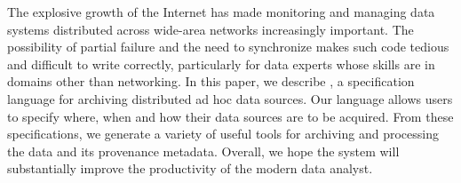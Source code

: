 The explosive growth of the Internet has made monitoring and managing
data systems distributed across wide-area networks increasingly
important.  The possibility of partial failure and the need to
synchronize makes such code tedious and difficult to write correctly,
particularly for data experts whose skills are in domains other than
networking. In this paper, we describe \padsd{}, a specification
language for archiving distributed ad hoc data sources.  Our language
allows users to specify where, when and how their data sources are
to be acquired. From these specifications,
we generate a variety of useful tools for archiving and processing the
data and its provenance metadata. 
Overall, we hope the system will substantially improve the productivity of
the modern data analyst.
